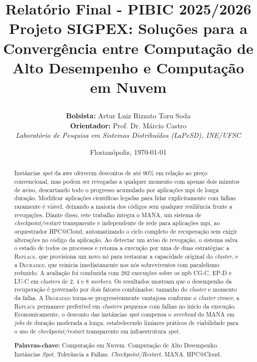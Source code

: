 \documentclass[a4paper,11pt]{article}
\title{
    \hspace{-0.6cm}\textbf{Relatório Final - PIBIC 2025/2026}\\[0.2cm]
    \hspace{-0.6cm}\textbf{Projeto SIGPEX:} Soluções para a Convergência entre Computação de Alto Desempenho e Computação em Nuvem

}
\author{
    \hspace{-0.6cm}\textbf{Bolsista:} Artur Luiz Rizzato Toru Soda\\
    \hspace{-0.6cm}\textbf{Orientador:} Prof. Dr. Márcio Castro\\
    \hspace{-0.6cm}\small{\emph{Laboratório de Pesquisa em Sistemas Distribuídos (LaPeSD), INE/UFSC}}
}
\date{\hspace{-0.6cm}\small{Florianópolis, \today}}
\begin{document}
    \maketitle

    \begin{abstract}
        Instâncias \textit{spot} da \gls{aws} oferecem descontos de até 90\%
        em relação ao preço convencional, mas podem ser revogadas a qualquer momento com
        apenas dois minutos de aviso, descartando todo o progresso acumulado por
        aplicações \gls{mpi} de longa duração. Modificar aplicações científicas legadas para
        lidar explicitamente com falhas raramente é viável, deixando a maioria dos
        códigos sem qualquer resiliência frente a revogações. Diante disso, este trabalho
        integra o MANA, um sistema de \textit{checkpoint/restart} transparente e
        independente de rede para aplicações \gls{mpi}, ao orquestrador HPC@Cloud,
        automatizando o ciclo completo de recuperação sem exigir alterações no
        código da aplicação. Ao detectar um aviso de revogação, o sistema salva o estado
        de todos os processos e retoma a execução por uma de duas estratégias: a
        \textsc{Replace}, que provisiona um novo nó para restaurar a capacidade original
        do \textit{cluster}, e a \textsc{Degraded}, que reinicia imediatamente nos nós
        sobreviventes com paralelismo reduzido. A avaliação foi conduzida com 282
        execuções sobre os \gls{npb} CG-C, EP-D e LU-C em
        \textit{clusters} de 2, 4 e 8 \textit{workers}. Os resultados mostram que o
        desempenho da recuperação é governado por dois fatores combinados: tamanho do
        \textit{cluster} e momento da falha. A \textsc{Degraded} torna-se
        progressivamente vantajosa conforme o \textit{cluster} cresce; a
        \textsc{Replace} permanece preferível em \textit{clusters} pequenos com falhas
        no início da execução. Economicamente, o desconto das instâncias \textit{spot} compensa o
        \textit{overhead} do MANA em \textit{jobs} de duração moderada a longa,
        estabelecendo limiares práticos de viabilidade para o uso de
        \textit{checkpoint/restart} transparente em infraestrutura \textit{spot}.

        \vspace{\baselineskip}
        \noindent\textbf{Palavras-chave:} Computação em Nuvem. Computação de Alto
        Desempenho. Instâncias \textit{Spot}. Tolerância a Falhas.
        \textit{Checkpoint/Restart}. MANA. HPC@Cloud.
    \end{abstract}
\end{document}
